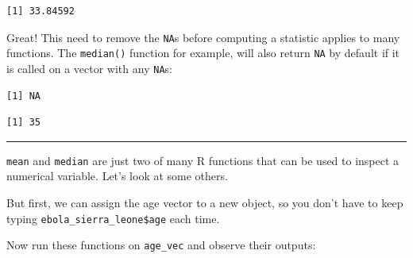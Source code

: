\documentclass[
  letterpaper,
  DIV=11,
  numbers=noendperiod]{scrreprt}
\newenvironment{Shaded}{\begin{snugshade}}{\end{snugshade}}
\newcommand{\AttributeTok}[1]{\textcolor[rgb]{0.40,0.45,0.13}{#1}}
\newcommand{\CommentTok}[1]{\textcolor[rgb]{0.37,0.37,0.37}{#1}}
\newcommand{\FunctionTok}[1]{\textcolor[rgb]{0.28,0.35,0.67}{#1}}
\newcommand{\NormalTok}[1]{\textcolor[rgb]{0.00,0.23,0.31}{#1}}
\newcommand{\OtherTok}[1]{\textcolor[rgb]{0.00,0.23,0.31}{#1}}
\newcommand{\SpecialCharTok}[1]{\textcolor[rgb]{0.37,0.37,0.37}{#1}}
\begin{document}
\begin{verbatim}
[1] 33.84592
\end{verbatim}

Great! This need to remove the \texttt{NA}s before computing a statistic
applies to many functions. The \texttt{median()} function for example,
will also return \texttt{NA} by default if it is called on a vector with
any \texttt{NA}s:

\begin{Shaded}
\end{Shaded}

\begin{verbatim}
[1] NA
\end{verbatim}

\begin{Shaded}
\end{Shaded}

\begin{verbatim}
[1] 35
\end{verbatim}

\begin{center}\rule{0.5\linewidth}{0.5pt}\end{center}

\texttt{mean} and \texttt{median} are just two of many R functions that
can be used to inspect a numerical variable. Let's look at some others.

But first, we can assign the age vector to a new object, so you don't
have to keep typing \texttt{ebola\_sierra\_leone\$age} each time.

\begin{Shaded}
\end{Shaded}

Now run these functions on \texttt{age\_vec} and observe their outputs:
\end{document}
